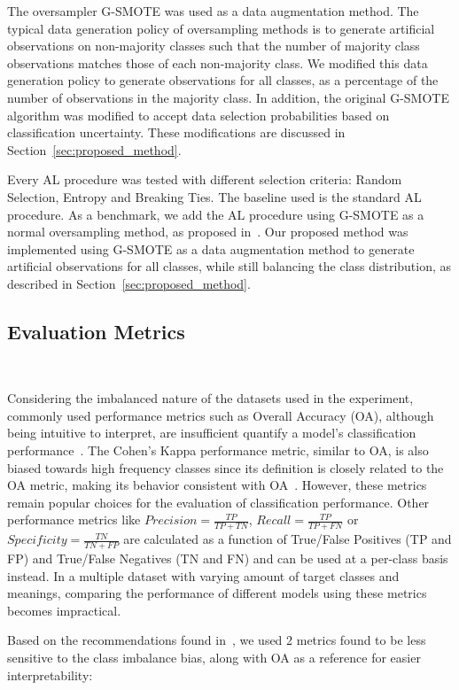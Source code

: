 \documentclass[preprint, 12pt]{elsarticle}
\begin{document}
The oversampler G-SMOTE was used as a data augmentation method. The typical
data generation policy of oversampling methods is to generate artificial
observations on non-majority classes such that the number of majority class
observations matches those of each non-majority class. We modified this data
generation policy to generate observations for all classes, as a percentage of
the number of observations in the majority class. In addition, the original
G-SMOTE algorithm was modified to accept data selection probabilities based on
classification uncertainty. These modifications are discussed in
Section~\ref{sec:proposed_method}.

Every AL procedure was tested with different selection criteria: Random
Selection, Entropy and Breaking Ties. The baseline used is the standard AL
procedure. As a benchmark, we add the AL procedure using G-SMOTE as a normal
oversampling method, as proposed in~\cite{Fonseca2021}. Our proposed method
was implemented using G-SMOTE as a data augmentation method to generate
artificial observations for all classes, while still balancing the class
distribution, as described in Section~\ref{sec:proposed_method}. 
 
\subsection{Evaluation Metrics}~\label{sec:evaluation_metrics}

Considering the imbalanced nature of the datasets used in the experiment,
commonly used performance metrics such as Overall Accuracy (OA), although
being intuitive to interpret, are insufficient quantify a model's
classification performance~\cite{Jeni2013}. The Cohen's Kappa performance
metric, similar to OA, is also biased towards high frequency classes since its
definition is closely related to the OA metric, making its behavior consistent
with OA~\cite{Fatourechi2008}. However, these metrics remain popular choices
for the evaluation of classification performance. Other performance metrics
like $Precision = \frac{TP}{TP+TN}$, $Recall = \frac{TP}{TP+FN}$ or
$Specificity = \frac{TN}{TN + FP}$ are calculated as a function of True/False
Positives (TP and FP) and True/False Negatives (TN and FN) and can be used at
a per-class basis instead. In a multiple dataset with varying amount of target
classes and meanings, comparing the performance of different models using
these metrics becomes impractical.
 
Based on the recommendations found in~\cite{Jeni2013, Kubat1997}, we used 2
metrics found to be less sensitive to the class imbalance bias, along with OA
as a reference for easier interpretability:
\end{document}
